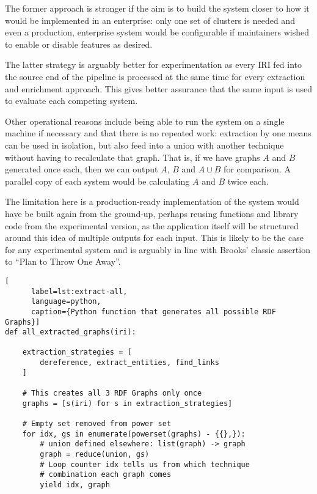 The former approach is stronger if the aim is to build the system
closer to how it would be implemented in an enterprise: only one
set of clusters is needed and even a production, enterprise system
would be configurable if maintainers wished to enable or disable
features as desired.

The latter strategy is arguably better for experimentation as every
IRI fed into the source end of the pipeline is processed at the same
time for every extraction and enrichment approach. This gives better
assurance that the same input is used to evaluate each competing
system.

Other operational reasons include being able to run the system on a
single machine if necessary and that there is no repeated work:
extraction by one means can be used in isolation, but also feed into
a union with another technique without having to recalculate that
graph. That is, if we have graphs $A$ and $B$ generated once each,
then we can output $A$, $B$ and $A \cup B$ for comparison. A parallel copy
of each system would be calculating $A$ and $B$ twice each.

The limitation here is a production-ready implementation of the
system would have be built again from the ground-up, perhaps reusing
functions and library code from the experimental version, as the
application itself will be structured around this idea of multiple
outputs for each input. This is likely to be the case for any
experimental system and is arguably in line with Brooks' classic
assertion to ``Plan to Throw One Away''\cite{brooks1995mythical}.

\begin{centering}
  \begin{lstlisting}[
      label=lst:extract-all,
      language=python,
      caption={Python function that generates all possible RDF Graphs}]
def all_extracted_graphs(iri):
    
    extraction_strategies = [
        dereference, extract_entities, find_links
    ]

    # This creates all 3 RDF Graphs only once
    graphs = [s(iri) for s in extraction_strategies]

    # Empty set removed from power set
    for idx, gs in enumerate(powerset(graphs) - {{},}):
        # union defined elsewhere: list(graph) -> graph
        graph = reduce(union, gs)
        # Loop counter idx tells us from which technique
        # combination each graph comes
        yield idx, graph
  \end{lstlisting}
\end{centering}

